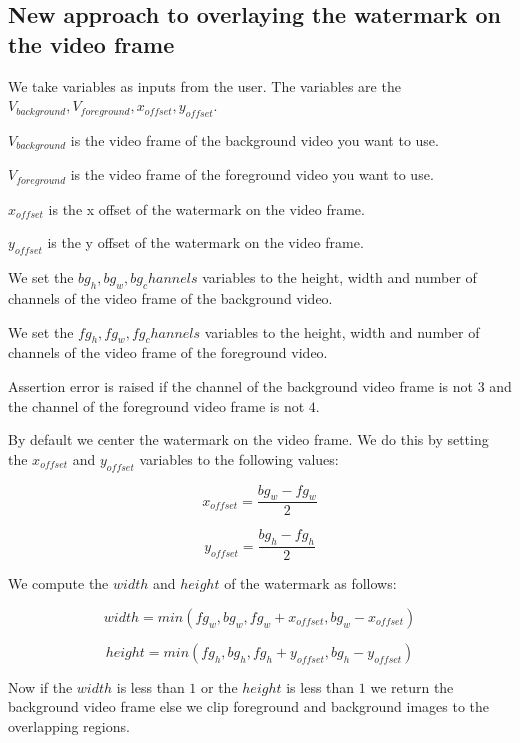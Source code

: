 \documentclass[ebook,12pt,oneside,openany]{memoir}
\begin{document}
\subsection{New approach to overlaying the watermark on the video frame}

We take variables as inputs from the user. The variables are the $V_{background}, V_{foreground}, x_{offset}, y_{offset}$.

$V_{background}$ is the video frame of the background video you want to use.

$V_{foreground}$ is the video frame of the foreground video you want to use.

$x_{offset}$ is the x offset of the watermark on the video frame.

$y_{offset}$ is the y offset of the watermark on the video frame. 

We set the $bg_h, bg_w, bg_channels$ variables to the height, width and number of channels of the video frame of the background video.

We set the $fg_h, fg_w, fg_channels$ variables to the height, width and number of channels of the video frame of the foreground video.

Assertion error is raised if the channel of the background video frame is not $3$ and the channel of the foreground video frame is not $4$.

By default we center the watermark on the video frame. We do this by setting the $x_{offset}$ and $y_{offset}$ variables to the following values:

\begin{equation}
x_{offset} = \frac{bg_w - fg_w}{2}
\end{equation}

\begin{equation}
y_{offset} = \frac{bg_h - fg_h}{2}
\end{equation}

We compute the $width$ and $height$ of the watermark as follows:

\begin{equation}
    width = min(fg_w, bg_w, fg_w + x_{offset}, bg_w - x_{offset})
\end{equation}

\begin{equation}
    height = min(fg_h, bg_h, fg_h + y_{offset}, bg_h - y_{offset})
\end{equation}

Now if the $width$ is less than $1$ or the $height$ is less than $1$ we return the background video frame else
we clip foreground and background images to the overlapping regions.
\end{document}
